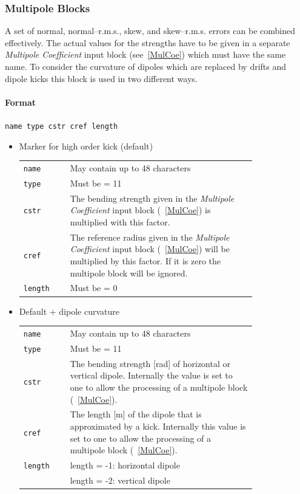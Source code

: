 \subsubsection{Multipole Blocks} \label{MulBlo}

A set of normal, normal--r.m.s., skew, and skew--r.m.s. errors can be combined effectively.
The actual values for the strengths have to be given in a separate \textit{Multipole Coefficient} input block (see~\ref{MulCoe}) which must have the same name.
To consider the curvature of dipoles which are replaced by drifts and dipole kicks this block is used in two different ways.

\paragraph{Format} \texttt{name type cstr cref length}

\begin{itemize}
    \item Marker for high order kick (default)\\
    \bigskip
    \begin{tabular}{@{}lp{0.8\linewidth}}
        \texttt{name} & May contain up to 48 characters \\
        \texttt{type} & Must be = 11 \\
        \texttt{cstr} & The bending strength given in the \textit{Multipole Coefficient} input block (~\ref{MulCoe}) is multiplied with this factor.\\
        \texttt{cref} & The reference radius given in the \textit{Multipole Coefficient} input block (~\ref{MulCoe}) will be multiplied by this factor. If it is zero the multipole block will be ignored. \\
        \texttt{length} & Must be = 0
    \end{tabular}
    \item Default + dipole curvature \\
    \bigskip
    \begin{tabular}{@{}lp{0.8\linewidth}}
        \texttt{name} & May contain up to 48 characters \\
        \texttt{type} & Must be = 11 \\
        \texttt{cstr} & The bending strength [rad] of horizontal or vertical dipole. Internally the value is set to one to allow the processing of a multipole block (~\ref{MulCoe}).\\
        \texttt{cref} & The length [m] of the dipole that is approximated by a kick. Internally this value is set to one to allow the processing of a multipole block (~\ref{MulCoe}). \\
        \texttt{length} & length = -1: horizontal dipole \\
                        & length = -2: vertical dipole
    \end{tabular}
\end{itemize}

